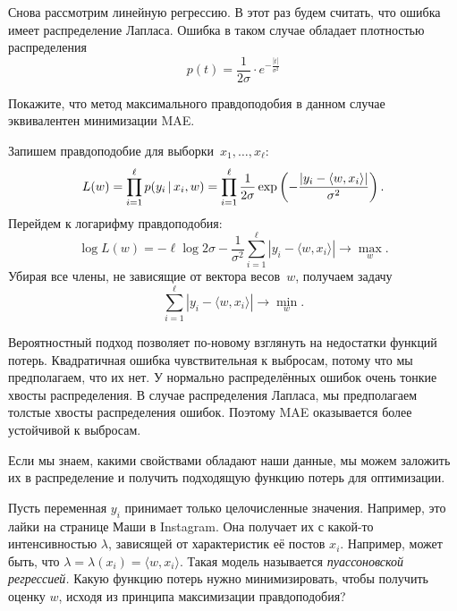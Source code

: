 \documentclass[12pt,fleqn]{article}
\begin{document}
Снова рассмотрим линейную регрессию. В этот раз будем считать, что ошибка имеет распределение Лапласа. Ошибка в таком случае обладает плотностью распределения 
\[
   p(t) = \frac{1}{2 \sigma} \cdot e^{-\frac{|t|}{\sigma^2}}
\]

\begin{vkProblem}
    Покажите, что метод максимального правдоподобия в данном случае эквивалентен минимизации MAE.
\end{vkProblem}

\begin{esSolution}
Запишем правдоподобие для выборки~$x_1, \dots, x_\ell$:
    \[
        L(w)
        =
        \prod_{i = 1}^{\ell} p(y_i \mspace{3mu}{|}\mspace{3mu} x_i, w)
        =
        \prod_{i = 1}^{\ell}
            \frac{1}{2 \sigma}
            \exp\left(
                - \frac{|y_i - \langle w, x_i \rangle|}{\sigma^2}
            \right).
    \]
    Перейдем к логарифму правдоподобия:
    \[
        \log L(w)
        =
        -\ell \log 2 \sigma -
        \frac{1}{\sigma^2} \sum_{i = 1}^{\ell} |y_i - \langle w, x_i \rangle|
        \to \max_w.
    \]
    Убирая все члены, не зависящие от вектора весов~$w$,
    получаем задачу
    \[
        \sum_{i = 1}^{\ell} |y_i - \langle w, x_i \rangle| \to \min_w.
    \]
\end{esSolution}

Вероятностный подход позволяет по-новому взглянуть на недостатки функций потерь. Квадратичная ошибка чувствительная к выбросам, потому что мы предполагаем, что их нет. У нормально распределённых ошибок очень тонкие хвосты распределения. В случае распределения Лапласа, мы предполагаем толстые хвосты распределения ошибок. Поэтому MAE оказывается более устойчивой к выбросам. 

Если мы знаем, какими свойствами обладают наши данные, мы можем заложить их в распределение и получить подходящую функцию потерь для оптимизации. 

\begin{vkProblem}
    Пусть переменная $y_i$ принимает только целочисленные значения. Например, это лайки на странице Маши в Instagram. Она получает их с какой-то интенсивностью $\lambda$, зависящей от характеристик её постов $x_i$. Например, может быть, что  $\lambda = \lambda(x_i) = \langle w, x_i \rangle.$ Такая модель называется \emph{пуассоновской регрессией.} Какую функцию потерь нужно минимизировать, чтобы получить оценку $w$, исходя из принципа максимизации правдоподобия? 
\end{vkProblem}
\end{document}
